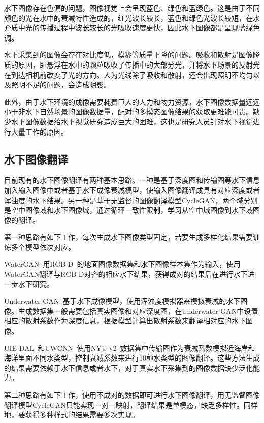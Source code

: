 水下图像存在色偏的问题，图像视觉上会呈现蓝色、绿色和蓝绿色。这是由于不同颜色的光在水中的衰减特性造成的，红光波长较长，蓝色和绿色光波长较短，在水介质中光的传播过程中波长较长的光吸收速度更快，因此水下图像都是呈现蓝绿色调。

水下采集到的图像会存在对比度低，模糊等质量下降的问题。吸收和散射是图像降质的原因，即悬浮在水中的颗粒吸收了传播中的大部分光，并将水下场景的反射光在到达相机前改变了光的方向。人为光线除了吸收和散射，还会出现照明不均匀以及照明不足的问题，会造成阴影。


此外，由于水下环境的成像需要耗费巨大的人力和物力资源，水下图像数据量远远小于非水下自然场景的图像数据量，配对的多模态图像结果的获取更难能可贵。缺少水下图像数据给水下视觉研究造成巨大的困难，这也是研究人员针对水下视觉进行大量工作的原因。

\subsection{水下图像翻译}
目前现有的水下图像翻译有两种基本思路。一种是基于深度图和传输图等水下信息加入输入图像中或者基于水下成像衰减模型，使输入图像翻译成具有对应深度或者浑浊度的水下结果。另一种是基于无监督的图像翻译模型CycleGAN，两个域分别是空中图像域和水下图像域，通过循环一致性限制，学习从空中域图像到水下域图像的翻译。


第一种思路有如下工作，每次生成水下图像类型固定，若要生成多样化结果需要训练多个模型依次对应。

WaterGAN~\cite{li2017watergan}用RGB-D~\cite{janoch2013category,lai2014unsupervised,silberman2011indoor,shotton2013scene}的地面图像数据集和水下图像样本集作为输入，使用WaterGAN翻译与RGB-D对齐的相应水下结果，获得成对的结果后在进行水下进一步水下研究。

Underwater-GAN~\cite{yu2018underwater}基于水下成像模型，使用浑浊度模拟器来模拟衰减的水下图像。生成数据集一般需要包括真实图像和对应深度图，在Underwater-GAN中设置相应的散射系数作为深度信息，根据模型计算出散射系数来翻译相对应的水下图像。

UIE-DAL~\cite{uplavikar2019all}和UWCNN~\cite{li2020underwater}使用NYU v2~\cite{silberman2012indoor}数据集中传输图作为衰减系数模拟近海岸和海洋里面不同水类型，控制衰减系数来进行10种水类型的图像翻译。这些方法生成的结果需要依赖于水下信息或者水下，对于真实水下采集到的图像数据缺少泛化能力。

第二种思路有如下工作，使用不成对的数据即可进行水下图像翻译，用无监督图像翻译模型CycleGAN只能实现一对一映射，翻译结果是单模态，缺乏多样性。同样地，要获得多种样式的结果需要多次实现。

